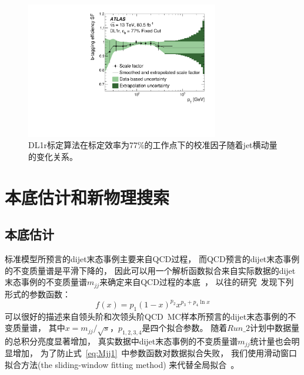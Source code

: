 \begin{figure}[thbp]
  \centering
  \includegraphics[width=0.75\textwidth]{figs/fig_01.pdf}
  \caption{  DL1r标定算法在标定效率为$77\%$的工作点下的校准因子随着jet横动量的变化关系。 }
  \label{fig:SF}
\end{figure}




\section{本底估计和新物理搜索}
\label{sec:DijetMjj}


\subsection{本底估计}
\label{sec:DijetMjj1}

标准模型所预言的dijet末态事例主要来自QCD过程，
而QCD预言的dijet末态事例的不变质量谱是平滑下降的，
因此可以用一个解析函数拟合来自实际数据的dijet末态事例的不变质量谱$m_{jj}$来确定来自QCD过程的本底~\cite{UA3}，
以往的研究~\cite{ATLASDijet1,ATLASDijet2,ATLASDijet5}发现下列形式的参数函数：
\begin{equation}
\label{eq:Mjj1}
f(x)=p_1(1-x)^{p_2}x^{p_3+p_4\ln x}
\end{equation}
可以很好的描述来自领头阶和次领头阶QCD~MC样本所预言的dijet末态事例的不变质量谱，
其中$x= m_{jj}/\sqrt{s}$，$p_{1,2,3,4}$是四个拟合参数。
随着$Run\_2$计划中数据量的总积分亮度显著增加，
真实数据中dijet末态事例的不变质量谱$m_{jj}$统计量也会明显增加，
为了防止式~\ref{eq:Mjj1}~中参数函数对数据拟合失败，
我们使用滑动窗口拟合方法(the sliding-window fitting method)
来代替全局拟合~\cite{ATLASDijet8}。

